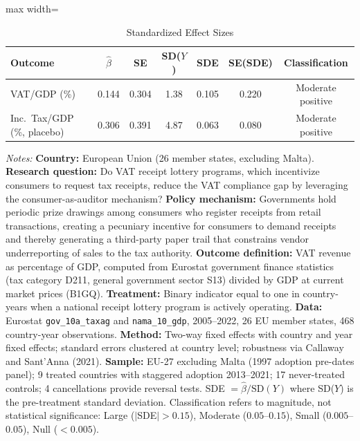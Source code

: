 \begin{table}[t]
\centering
\caption{Standardized Effect Sizes}
\label{tab:sde}
\begin{adjustbox}{max width=\textwidth}
\begin{tabular}{lcccccc}
\toprule
Outcome & $\hat{\beta}$ & SE & SD($Y$) & SDE & SE(SDE) & Classification \\
\midrule
VAT/GDP (\%) & 0.144 & 0.304 & 1.38 & 0.105 & 0.220 & Moderate positive \\
Inc.\ Tax/GDP (\%, placebo) & 0.306 & 0.391 & 4.87 & 0.063 & 0.080 & Moderate positive \\
\bottomrule
\end{tabular}
\end{adjustbox}
\begin{tablenotes}
\small
\item \textit{Notes:} \textbf{Country:} European Union (26 member states, excluding Malta). \textbf{Research question:} Do VAT receipt lottery programs, which incentivize consumers to request tax receipts, reduce the VAT compliance gap by leveraging the consumer-as-auditor mechanism? \textbf{Policy mechanism:} Governments hold periodic prize drawings among consumers who register receipts from retail transactions, creating a pecuniary incentive for consumers to demand receipts and thereby generating a third-party paper trail that constrains vendor underreporting of sales to the tax authority. \textbf{Outcome definition:} VAT revenue as percentage of GDP, computed from Eurostat government finance statistics (tax category D211, general government sector S13) divided by GDP at current market prices (B1GQ). \textbf{Treatment:} Binary indicator equal to one in country-years when a national receipt lottery program is actively operating. \textbf{Data:} Eurostat \texttt{gov\_10a\_taxag} and \texttt{nama\_10\_gdp}, 2005--2022, 26 EU member states, 468 country-year observations. \textbf{Method:} Two-way fixed effects with country and year fixed effects; standard errors clustered at country level; robustness via Callaway and Sant'Anna (2021). \textbf{Sample:} EU-27 excluding Malta (1997 adoption pre-dates panel); 9 treated countries with staggered adoption 2013--2021; 17 never-treated controls; 4 cancellations provide reversal tests. SDE $= \hat{\beta} / \text{SD}(Y)$ where SD($Y$) is the pre-treatment standard deviation. Classification refers to magnitude, not statistical significance: Large ($|$SDE$| > 0.15$), Moderate ($0.05$--$0.15$), Small ($0.005$--$0.05$), Null ($< 0.005$).
\end{tablenotes}
\end{table}
